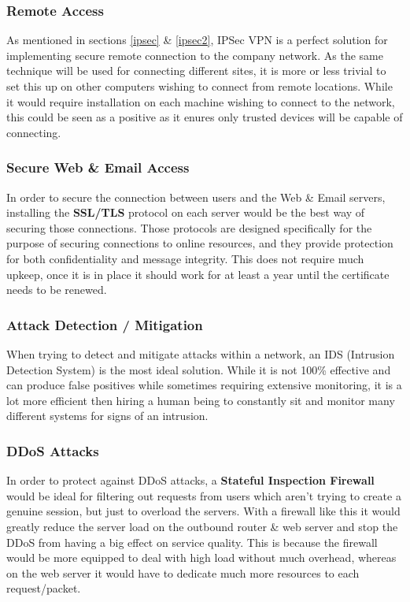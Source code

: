 \documentclass[11pt]{article}
\begin{document}
        \subsubsection{Remote Access}
          As mentioned in sections \ref{ipsec} \& \ref{ipsec2}, IPSec VPN is a perfect solution for implementing secure remote connection to the company network. As the same technique will be used for connecting different sites, it is more or less trivial to set this up on other computers wishing to connect from remote locations. While it would require installation on each machine wishing to connect to the network, this could be seen as a positive as it enures only trusted devices will be capable of connecting.

        \subsubsection{Secure Web \& Email Access}
          In order to secure the connection between users and the Web \& Email servers, installing the \textbf{SSL/TLS} protocol on each server would be the best way of securing those connections. Those protocols are designed specifically for the purpose of securing connections to online resources, and they provide protection for both confidentiality and message integrity. This does not require much upkeep, once it is in place it should work for at least a year until the certificate needs to be renewed.

        \subsubsection{Attack Detection / Mitigation}
          When trying to detect and mitigate attacks within a network, an IDS (Intrusion Detection System) is the most ideal solution. While it is not 100\% effective and can produce false positives while sometimes requiring extensive monitoring, it is a lot more efficient then hiring a human being to constantly sit and monitor many different systems for signs of an intrusion.

        \subsubsection{DDoS Attacks}
          In order to protect against DDoS attacks, a \textbf{Stateful Inspection Firewall} would be ideal for filtering out requests from users which aren't trying to create a genuine session, but just to overload the servers. With a firewall like this it would greatly reduce the server load on the outbound router \& web server and stop the DDoS from having a big effect on service quality. This is because the firewall would be more equipped to deal with high load without much overhead, whereas on the web server it would have to dedicate much more resources to each request/packet.
\end{document}
